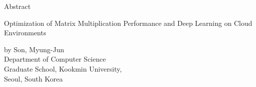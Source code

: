 
Abstract 
\begin{center}
    \textnormal{\fontsize{13}{13}\selectfont Optimization of Matrix Multiplication Performance and Deep Learning on Cloud Environments}  
\end{center}

\begin{flushright}
    \textnormal{\fontsize{11}{11}\selectfont by Son, Myung-Jun} \\
    \vspace{5mm} %
    \textnormal{\fontsize{11}{11}\selectfont Department of Computer Science} \\
    \textnormal{\fontsize{11}{11}\selectfont Graduate School, Kookmin University,} \\
    \textnormal{\fontsize{11}{11}\selectfont Seoul, South Korea} \\
\end{flushright}
    

\clearpage
